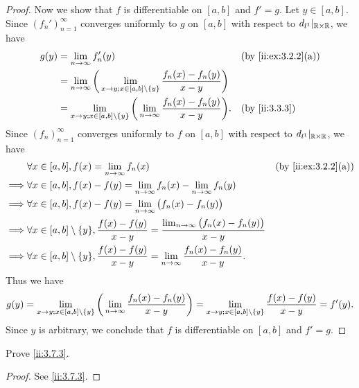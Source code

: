\begin{proof}
  Now we show that \(f\) is differentiable on \([a, b]\) and \(f' = g\).
  Let \(y \in [a, b]\).
  Since \((f_n')_{n = 1}^\infty\) converges uniformly to \(g\) on \([a, b]\) with respect to \(d_{l^1}|_{\mathbb{R} \times \mathbb{R}}\), we have
  \begin{align*}
    g(y) & = \lim_{n \to \infty} f_n'(y)                                                                                     &  & \by{ii:ex:3.2.2}[a] \\
         & = \lim_{n \to \infty} \bigg(\lim_{x \to y ; x \in [a, b] \setminus \set{y}} \dfrac{f_n(x) - f_n(y)}{x - y}\bigg)                        \\
         & = \lim_{x \to y ; x \in [a, b] \setminus \set{y}} \bigg(\lim_{n \to \infty} \dfrac{f_n(x) - f_n(y)}{x - y}\bigg). &  & \by{ii:3.3.3}
  \end{align*}
  Since \((f_n)_{n = 1}^\infty\) converges uniformly to \(f\) on \([a, b]\) with respect to \(d_{l^1}|_{\mathbb{R} \times \mathbb{R}}\), we have
  \begin{align*}
             & \forall x \in [a, b], f(x) = \lim_{n \to \infty} f_n(x)                                                                           &  & \by{ii:ex:3.2.2}[a] \\
    \implies & \forall x \in [a, b], f(x) - f(y) = \lim_{n \to \infty} f_n(x) - \lim_{n \to \infty} f_n(y)                                                             \\
    \implies & \forall x \in [a, b], f(x) - f(y) = \lim_{n \to \infty} \big(f_n(x) - f_n(y)\big)                                                                       \\
    \implies & \forall x \in [a, b] \setminus \set{y}, \dfrac{f(x) - f(y)}{x - y} = \dfrac{\lim_{n \to \infty} \big(f_n(x) - f_n(y)\big)}{x - y}                       \\
    \implies & \forall x \in [a, b] \setminus \set{y}, \dfrac{f(x) - f(y)}{x - y} = \lim_{n \to \infty} \dfrac{f_n(x) - f_n(y)}{x - y}.
  \end{align*}
  Thus we have
  \[
    g(y) = \lim_{x \to y ; x \in [a, b] \setminus \left\lbrace y\right\rbrace} \bigg(\lim_{n \to \infty} \dfrac{f_n(x) - f_n(y)}{x - y}\bigg) = \lim_{x \to y ; x \in [a, b] \setminus \left\lbrace y\right\rbrace} \dfrac{f(x) - f(y)}{x - y} = f'(y).
  \]
  Since \(y\) is arbitrary, we conclude that \(f\) is differentiable on \([a, b]\) and \(f' = g\).
\end{proof}

\begin{ex}\label{ii:ex:3.7.3}
  Prove \cref{ii:3.7.3}.
\end{ex}

\begin{proof}
  See \cref{ii:3.7.3}.
\end{proof}
